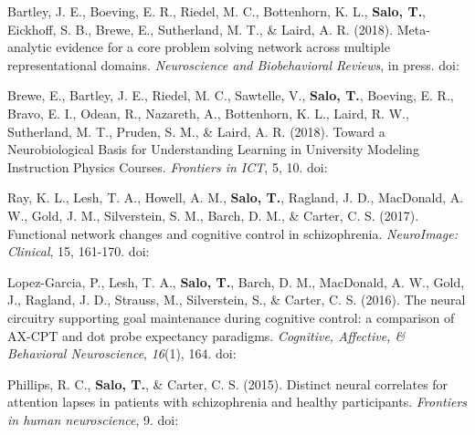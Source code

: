 \documentclass[10pt]{article}
\newcommand{\textlink}[3][blue]{\href{#2}{\color{#1}{#3}}}
\begin{document}
\begin{hangparas}{.25in}{1}

	Bartley, J. E., Boeving, E. R., Riedel, M. C., Bottenhorn, K. L.,
	\textbf{Salo, T.}, Eickhoff, S. B., Brewe, E., Sutherland, M. T.,
	\& Laird, A. R. (2018).
	Meta-analytic evidence for a core problem solving network across multiple
	representational domains. \emph{Neuroscience and Biobehavioral Reviews}, in press.
	doi:\textlink{https://doi.org/10.1016/j.neubiorev.2018.06.009}{10.1016/j.neubiorev.2018.06.009}

	\bigskip

	Brewe, E., Bartley, J. E., Riedel, M. C., Sawtelle, V., \textbf{Salo, T.},
	Boeving, E. R., Bravo, E. I., Odean, R., Nazareth, A., Bottenhorn, K. L.,
	Laird, R. W., Sutherland, M. T., Pruden, S. M., \& Laird, A. R. (2018).
	Toward a Neurobiological Basis for Understanding Learning in University Modeling
	Instruction Physics Courses. \emph{Frontiers in ICT}, 5, 10.
	doi:\textlink{https://doi.org/10.3389/fict.2018.00010}{10.3389/fict.2018.00010}

	\bigskip

	Ray, K. L., Lesh, T. A., Howell, A. M., \textbf{Salo, T.}, Ragland, J. D.,
	MacDonald, A. W., Gold, J. M., Silverstein, S. M., Barch, D. M., \& Carter,
	C. S. (2017). Functional network changes and cognitive control in schizophrenia.
	\emph{NeuroImage: Clinical}, 15, 161-170.
	doi:\textlink{https://doi.org/10.1016/j.nicl.2017.05.001}{10.1016/j.nicl.2017.05.001}

	\bigskip

	Lopez-Garcia, P., Lesh, T. A., \textbf{Salo, T.}, Barch, D. M., MacDonald,
	A. W., Gold, J., Ragland, J. D., Strauss, M., Silverstein, S., \& Carter, C. S.
	(2016). The neural circuitry supporting goal maintenance during cognitive
	control: a comparison of AX-CPT and dot probe expectancy paradigms.
	\emph{Cognitive, Affective, \& Behavioral Neuroscience}, \emph{16}(1), 164.
	doi:\textlink{https://doi.org/10.3758/s13415-015-0384-1}{10.3758/s13415-015-0384-1}

	\bigskip

	Phillips, R. C., \textbf{Salo, T.}, \& Carter, C. S. (2015). Distinct neural
	correlates for attention lapses in patients with schizophrenia and healthy
	participants. \emph{Frontiers in human neuroscience}, 9.
	doi:\textlink{https://doi.org/10.3389/fnhum.2015.00502}{10.3389/fnhum.2015.00502}

\end{hangparas}
\end{document}
